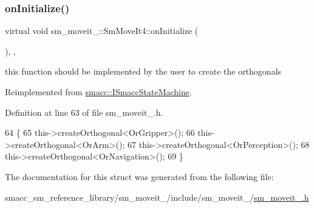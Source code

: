 \subsubsection{\texorpdfstring{on\+Initialize()}{onInitialize()}}
{\footnotesize\ttfamily virtual void sm\+\_\+moveit\+\_\+::\+Sm\+Move\+It4\+::on\+Initialize (\begin{DoxyParamCaption}{ }\end{DoxyParamCaption})\hspace{0.3cm}{\ttfamily [inline]}, {\ttfamily [override]}, {\ttfamily [virtual]}}



this function should be implemented by the user to create the orthogonals 



Reimplemented from \hyperlink{classsmacc_1_1ISmaccStateMachine_ac2982c6c8283663e5e1e8a7c82f511ec}{smacc\+::\+I\+Smacc\+State\+Machine}.



Definition at line 63 of file sm\+\_\+moveit\+\_.\+h.


\begin{DoxyCode}
64     \{
65         this->createOrthogonal<OrGripper>();
66         this->createOrthogonal<OrArm>();
67         this->createOrthogonal<OrPerception>();
68         this->createOrthogonal<OrNavigation>();
69     \}
\end{DoxyCode}


The documentation for this struct was generated from the following file\+:\begin{DoxyCompactItemize}
\item 
smacc\+\_\+sm\+\_\+reference\+\_\+library/sm\+\_\+moveit\+\_/include/sm\+\_\+moveit\+\_/\hyperlink{sm__moveit__4_8h}{sm\+\_\+moveit\+\_.\+h}\end{DoxyCompactItemize}
